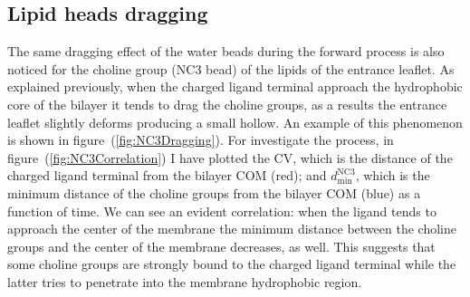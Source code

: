 \subsection{Lipid heads dragging}
The same dragging effect of the water beads during the forward process is also noticed for the choline group (NC$3$ \martini bead) of the lipids of the entrance leaflet. As explained previously, when the charged ligand terminal approach the hydrophobic core of the bilayer it tends to drag the choline groups, as a results the entrance leaflet slightly deforms producing a small hollow. An example of this phenomenon is shown in figure~(\ref{fig:NC3Dragging}). For investigate the process, in figure~(\ref{fig:NC3Correlation}) I have plotted the \ac{CV}, which is the distance of the charged ligand terminal from the bilayer \ac{COM} (red); and $d_\text{min}^{\text{NC}3}$, which is the minimum distance of the choline groups from the bilayer \ac{COM} (blue) as a function of time. We can see an evident correlation: when the ligand tends to approach the center of the membrane the minimum distance between the choline groups and the center of the membrane decreases, as well. This suggests that some choline groups are strongly bound to the charged ligand terminal while the latter tries to penetrate into the membrane hydrophobic region. 
